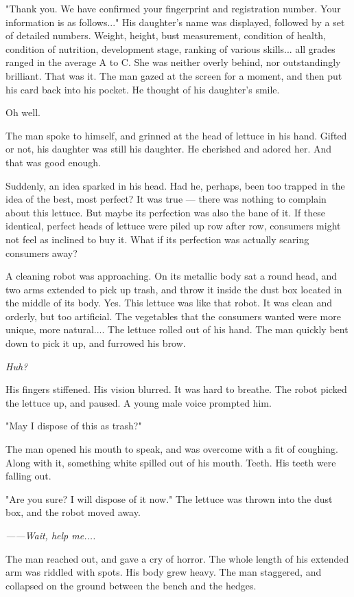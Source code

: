 "Thank you. We have confirmed your fingerprint and registration number.
Your information is as follows..." His daughter's name was displayed,
followed by a set of detailed numbers. Weight, height, bust measurement,
condition of health, condition of nutrition, development stage, ranking
of various skills... all grades ranged in the average A to C. She was
neither overly behind, nor outstandingly brilliant. That was it. The man
gazed at the screen for a moment, and then put his card back into his
pocket. He thought of his daughter's smile.

Oh well.

The man spoke to himself, and grinned at the head of lettuce in his
hand. Gifted or not, his daughter was still his daughter. He cherished
and adored her. And that was good enough.

Suddenly, an idea sparked in his head. Had he, perhaps, been too trapped
in the idea of the best, most perfect? It was true --- there was nothing
to complain about this lettuce. But maybe its perfection was also the
bane of it. If these identical, perfect heads of lettuce were piled up
row after row, consumers might not feel as inclined to buy it. What if
its perfection was actually scaring consumers away?

A cleaning robot was approaching. On its metallic body sat a round head,
and two arms extended to pick up trash, and throw it inside the dust box
located in the middle of its body. Yes. This lettuce was like that
robot. It was clean and orderly, but too artificial. The vegetables that
the consumers wanted were more unique, more natural.... The lettuce
rolled out of his hand. The man quickly bent down to pick it up, and
furrowed his brow.

\emph{Huh?}

His fingers stiffened. His vision blurred. It was hard to breathe. The
robot picked the lettuce up, and paused. A young male voice prompted
him.

"May I dispose of this as trash?"

The man opened his mouth to speak, and was overcome with a fit of
coughing. Along with it, something white spilled out of his mouth.
Teeth. His teeth were falling out.

"Are you sure? I will dispose of it now." The lettuce was thrown into
the dust box, and the robot moved away.

\emph{------Wait, help me....}

The man reached out, and gave a cry of horror. The whole length of his
extended arm was riddled with spots. His body grew heavy. The man
staggered, and collapsed on the ground between the bench and the hedges.

